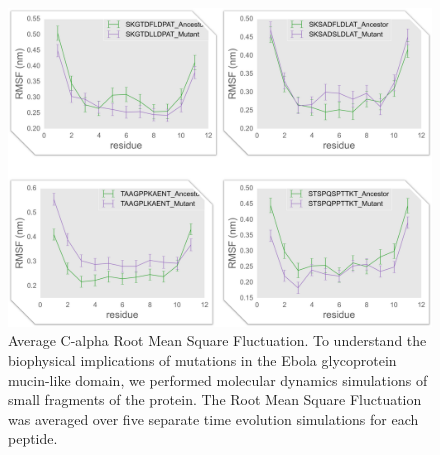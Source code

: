 \begin{figure}[htbp]
    \centering
    \includegraphics[width=1\textwidth]{figures/ebolagraphic001.png}
    \caption{Average C-alpha Root Mean Square Fluctuation. To understand the biophysical implications of mutations in the Ebola glycoprotein mucin-like domain, we performed molecular dynamics simulations of small fragments of the protein. The Root Mean Square Fluctuation was averaged over five separate time evolution simulations for each peptide.}
    \label{avgrms}
\end{figure}